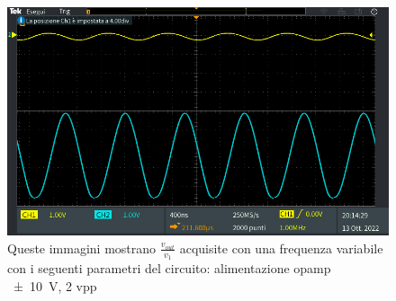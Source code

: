 \begin{figure}[!ht]
\begin{minipage}{.496\textwidth}
	\end{minipage}
	\begin{minipage}{.496\textwidth}
		\includegraphics[width=\linewidth]{./ImageFiles/Laboratorio 2/TEK00036.PNG}
	\end{minipage}
	\caption{Queste immagini mostrano $\frac{v_{out}}{v_{1}}$ acquisite con una frequenza variabile con i seguenti parametri del circuito: alimentazione opamp \SI{\pm10}{\volt}, 2 vpp}
	\label{fig:freqseccirc}
\end{figure}


